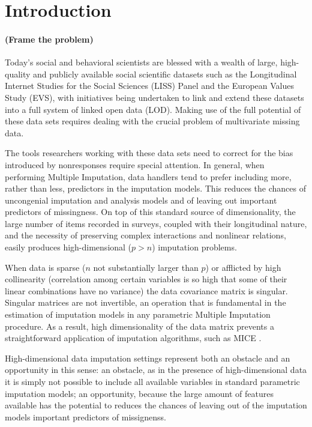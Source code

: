 \maketitle
\section{Introduction}

\paragraph{(Frame the problem)}

Today’s social and behavioral scientists are blessed with a wealth of large, high-quality and publicly available 
social scientific datasets such as the Longitudinal Internet Studies for the Social Sciences (LISS) Panel and 
the European Values Study (EVS), with initiatives being undertaken to link and extend these datasets into a full
system of linked open data (LOD).
Making use of the full potential of these data sets requires dealing with the crucial problem of multivariate
missing data.

The tools researchers working with these data sets need to correct for the bias introduced by nonresponses 
require special attention.
In general, when performing Multiple Imputation, data handlers tend to prefer including 
more, rather than less, predictors in the imputation models. This reduces the chances of uncongenial imputation 
and analysis models \citep{meng:1994} and of leaving out important predictors of missingness.
On top of this standard source of dimensionality, the large number of items recorded in surveys, coupled with their
longitudinal nature, and the necessity of preserving complex interactions and nonlinear relations, easily produces 
high-dimensional ($p>n$) imputation problems.

When data is sparse ($n$ not substantially larger than $p$) or afflicted by high collinearity (correlation among 
certain variables is so high that some of their linear combinations have no variance) the data covariance matrix
is singular. Singular matrices are not invertible, an operation that is fundamental in the
estimation of imputation models in any parametric Multiple Imputation procedure.
As a result, high dimensionality of the data matrix prevents a straightforward application of imputation algorithms, 
such as MICE \citep{vanBuuren:2012}.

High-dimensional data imputation settings represent both an obstacle and an opportunity in this sense: an 
obstacle, as in the presence of high-dimensional data it is simply not possible to include all available variables 
in standard parametric imputation models; 
an opportunity, because the large amount of features available has the potential to reduces the chances of 
leaving out of the imputation models important predictors of missignenss.

